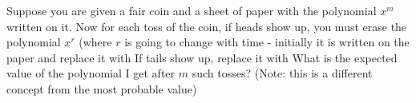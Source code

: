 Suppose you are given a fair coin and a sheet of paper with the polynomial $x^m$ written on it. Now for each toss of the coin, if heads show up, you must erase the polynomial $x^r$ (where $r$ is going to change with time - initially it is  written on the paper and replace it with  If tails show up, replace it with  What is the expected value of the polynomial I get after $m$ such tosses? (Note: this is a different concept from the most probable value)